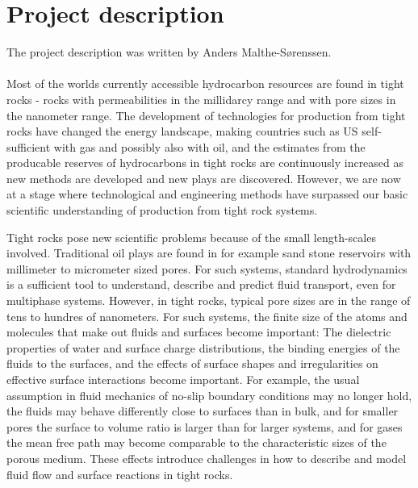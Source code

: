 \section{Project description}
The project description was written by Anders Malthe-S{\o}renssen.\\
\\
Most of the worlds currently accessible hydrocarbon resources are found in tight rocks - rocks with permeabilities in the millidarcy range and with pore sizes in the nanometer range. The development of technologies for production from tight rocks have changed the energy landscape, making countries such as US self-sufficient with gas and possibly also with oil, and the estimates from the producable reserves of hydrocarbons in tight rocks are continuously increased as new methods are developed and new plays are discovered. However, we are now at a stage where technological and engineering methods have surpassed our basic scientific understanding of production from tight rock systems.

Tight rocks pose new scientific problems because of the small length-scales involved. Traditional oil plays are found in for example sand stone reservoirs with millimeter to micrometer sized pores. For such systems, standard hydrodynamics is a sufficient tool to understand, describe and predict fluid transport, even for multiphase systems. However, in tight rocks, typical pore sizes are in the range of tens to hundres of nanometers. For such systems, the finite size of the atoms and molecules that make out fluids and surfaces become important: The dielectric properties of water and surface charge distributions, the binding energies of the fluids to the surfaces, and the effects of surface shapes and irregularities on effective surface interactions become important. For example, the usual assumption in fluid mechanics of no-slip boundary conditions may no longer hold, the fluids may behave differently close to surfaces than in bulk, and for smaller pores the surface to volume ratio is larger than for larger systems, and for gases the mean free path may become comparable to the characteristic sizes of the porous medium. These effects introduce challenges in how to describe and model fluid flow and surface reactions in tight rocks.

